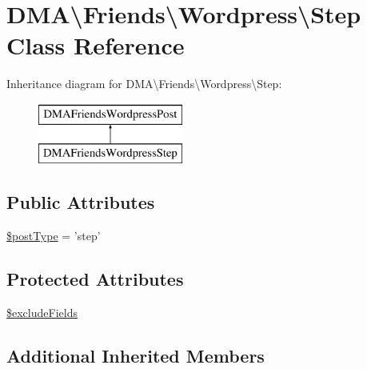 \hypertarget{classDMA_1_1Friends_1_1Wordpress_1_1Step}{\section{D\+M\+A\textbackslash{}Friends\textbackslash{}Wordpress\textbackslash{}Step Class Reference}
\label{classDMA_1_1Friends_1_1Wordpress_1_1Step}
}
Inheritance diagram for D\+M\+A\textbackslash{}Friends\textbackslash{}Wordpress\textbackslash{}Step\+:\begin{figure}[H]
\begin{center}
\leavevmode
\includegraphics[height=2.000000cm]{d0/d87/classDMA_1_1Friends_1_1Wordpress_1_1Step}
\end{center}
\end{figure}
\subsection*{Public Attributes}
\begin{DoxyCompactItemize}
\item 
\hyperlink{classDMA_1_1Friends_1_1Wordpress_1_1Step_abaa142e178d837a810e5048af7f36497}{\$post\+Type} = 'step'
\end{DoxyCompactItemize}
\subsection*{Protected Attributes}
\begin{DoxyCompactItemize}
\item 
\hyperlink{classDMA_1_1Friends_1_1Wordpress_1_1Step_aa320e2b0f3f4a24c3cea41e133fd1145}{\$exclude\+Fields}
\end{DoxyCompactItemize}
\subsection*{Additional Inherited Members}


